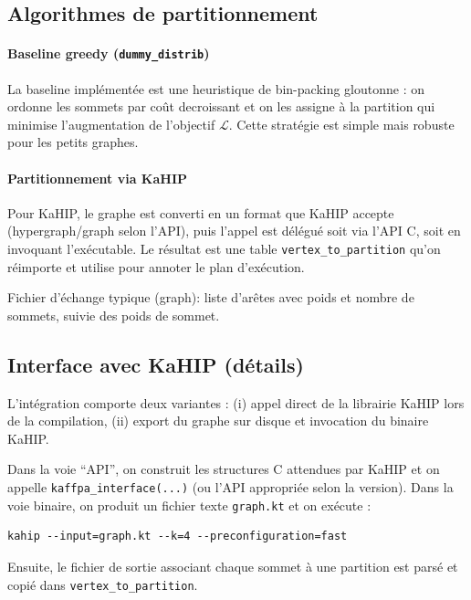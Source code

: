 \documentclass[11pt,a4paper]{article}
\begin{document}
\subsection{Algorithmes de partitionnement}

\paragraph{Baseline greedy (\texttt{dummy\_distrib})}

La baseline impl\'ement\'ee est une heuristique de bin-packing gloutonne : on ordonne les sommets par co\^ut decroissant et on les assigne \`a la partition qui minimise l'augmentation de l'objectif $\mathcal{L}$. Cette strat\'egie est simple mais robuste pour les petits graphes.

\paragraph{Partitionnement via KaHIP}

Pour KaHIP, le graphe est converti en un format que KaHIP accepte (hypergraph/graph selon l'API), puis l'appel est d\'el\'egu\'e soit via l'API C, soit en invoquant l'ex\'ecutable. Le r\'esultat est une table \texttt{vertex\_to\_partition} qu'on r\'eimporte et utilise pour annoter le plan d'ex\'ecution.

Fichier d'\'echange typique (graph): liste d'ar\^etes avec poids et nombre de sommets, suivie des poids de sommet.

\subsection{Interface avec KaHIP (d\'etails)}

L'int\'egration comporte deux variantes : (i) appel direct de la librairie KaHIP lors de la compilation, (ii) export du graphe sur disque et invocation du binaire KaHIP.

Dans la voie ``API'', on construit les structures C attendues par KaHIP et on appelle \texttt{kaffpa\_interface(...)} (ou l'API appropri\'ee selon la version). Dans la voie binaire, on produit un fichier texte \texttt{graph.kt} et on ex\'ecute :
\begin{verbatim}
kahip --input=graph.kt --k=4 --preconfiguration=fast
\end{verbatim}

Ensuite, le fichier de sortie associant chaque sommet \`a une partition est pars\'e et copi\'e dans \texttt{vertex\_to\_partition}.
\end{document}
